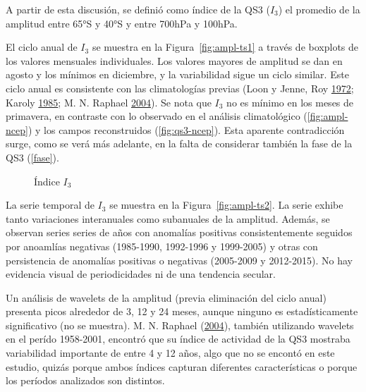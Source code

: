 \documentclass[spanish,a4paper,12p]{book}
\begin{document}
A partir de esta discusión, se definió como índice de la QS3 (\(I_3\))
el promedio de la amplitud entre 65°S y 40°S y entre 700hPa y 100hPa.

El ciclo anual de \(I_3\) se muestra en la Figura~\ref{fig:ampl-ts1} a
través de boxplots de los valores mensuales individuales. Los valores
mayores de amplitud se dan en agosto y los mínimos en diciembre, y la
variabilidad sigue un ciclo similar. Este ciclo anual es consistente con
las climatologías previas (Loon y Jenne, Roy
\protect\hyperlink{ref-Loon1972}{1972}; Karoly
\protect\hyperlink{ref-Karoly1985}{1985}; M. N. Raphael
\protect\hyperlink{ref-Raphael2004}{2004}). Se nota que \(I_3\) no es
mínimo en los meses de primavera, en contraste con lo observado en el
análisis climatológico (\autoref{fig:ampl-ncep}) y los campos
reconstruidos (\autoref{fig:qs3-ncep}). Esta aparente contradicción
surge, como se verá más adelante, en la falta de considerar también la
fase de la QS3 (\autoref{fase}).

\begin{figure*}
\newline{}\caption{Índice $I_3$}\label{fig:ampl-ts}
\end{figure*}

La serie temporal de \(I_3\) se muestra en la Figura~\ref{fig:ampl-ts2}.
La serie exhibe tanto variaciones interanuales como subanuales de la
amplitud. Además, se observan series series de años con anomalías
positivas consistentemente seguidos por anoamlías negativas (1985-1990,
1992-1996 y 1999-2005) y otras con persistencia de anomalías positivas o
negativas (2005-2009 y 2012-2015). No hay evidencia visual de
periodicidades ni de una tendencia secular.

Un análisis de wavelets de la amplitud (previa eliminación del ciclo
anual) presenta picos alrededor de 3, 12 y 24 meses, aunque ninguno es
estadísticamente significativo (no se muestra). M. N. Raphael
(\protect\hyperlink{ref-Raphael2004}{2004}), también utilizando wavelets
en el perído 1958-2001, encontró que su índice de actividad de la QS3
mostraba variabilidad importante de entre 4 y 12 años, algo que no se
encontó en este estudio, quizás porque ambos índices capturan diferentes
características o porque los períodos analizados son distintos.
\end{document}
